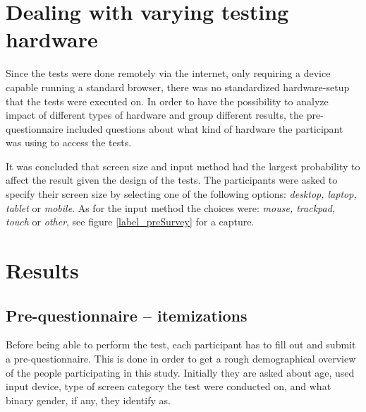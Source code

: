 
\section{Dealing with varying testing hardware}

  Since the tests were done remotely via the internet, only requiring a
  device capable running a standard browser, there was no standardized
  hardware-setup that the tests were executed on. In order to have the
  possibility to analyze impact of different types of hardware and group
  different results, the pre-questionnaire included questions about what
  kind of hardware the participant was using to access the tests.

  It was concluded that screen size and input method had the largest
  probability to affect the result given the design of the tests.
  The participants were asked to specify their screen size by selecting one
  of the following options: \textit{desktop, laptop, tablet} or
  \textit{mobile}. As for the input method the choices were:
  \textit{mouse, trackpad, touch} or \textit{other}, see figure
  \ref{label_preSurvey} for a capture.


\section{Results}


  \subsection{Pre-questionnaire -- itemizations}

    Before being able to perform the test, each participant has to fill
    out and submit a pre-questionnaire. This is done in order to get
    a rough demographical overview of the people participating in this
    study. Initially they are asked about age, used input device, type of
    screen category the test were conducted on, and what binary gender, if
    any, they identify as.

